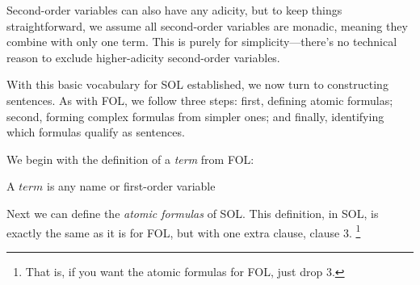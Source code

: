 Second-order variables can also have any adicity, but to keep things straightforward, we assume all second-order variables are monadic, meaning they combine with only one term. This is purely for simplicity—there’s no technical reason to exclude higher-adicity second-order variables.

With this basic vocabulary for SOL established, we now turn to constructing sentences. As with FOL, we follow three steps: first, defining atomic formulas; second, forming complex formulas from simpler ones; and finally, identifying which formulas qualify as sentences.

We begin with the definition of a \textit{term} from FOL: \\
\begin{definition}
    A $term$ is any name or first-order variable
\end{definition}

Next we can define the \textit{atomic formulas} of SOL. This definition, in SOL, is exactly the same as it is for FOL, but with one extra clause, clause
3. \footnote{That is, if you want the atomic formulas for FOL, just drop 3.}

